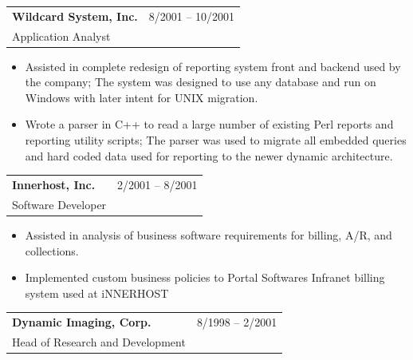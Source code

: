 \documentclass[10pt]{report}
\begin{document}
\noindent
\begin{tabular}{ L{.5\textwidth}  R{.4\textwidth} }
\textbf{\large Wildcard System, Inc.} & 8/2001 -- 10/2001 \\
Application Analyst
\end{tabular}

\begin{itemize}
\item Assisted in complete redesign of reporting system front and backend used by the company; The system was designed to use any database and run on Windows with later intent for UNIX migration.
\item Wrote a parser in C++ to read a large number of existing Perl reports and reporting utility scripts; The parser was used to migrate all embedded queries and hard coded data used for reporting to the newer dynamic architecture.
\end{itemize}
\bigskip

\noindent
\begin{tabular}{ L{.5\textwidth}  R{.4\textwidth} }
\textbf{\large Innerhost, Inc.} & 2/2001 -- 8/2001 \\
Software Developer
\end{tabular}

\begin{itemize}
\item Assisted in analysis of business software requirements for billing, A/R, and collections.
\item Implemented custom business policies to Portal Software\textquotesingle s Infranet billing system used at iNNERHOST
\end{itemize}
\bigskip


\noindent
\begin{tabular}{ L{.5\textwidth}  R{.4\textwidth} }
\textbf{\large Dynamic Imaging, Corp.}  & 8/1998 -- 2/2001 \\
Head of Research and Development &
\end{tabular}
\end{document}
